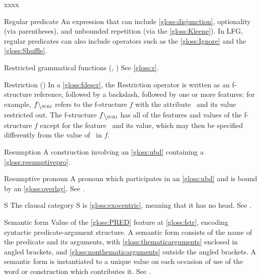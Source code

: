 \documentclass[output=paper,colorlinks,citecolor=brown]{langscibook}
\begin{document}
\begin{labeling}{xxxx}
\item[Regular predicate\namedlabel{gloss:regpreds}{regular predicates}] An expression that can include \ref{gloss:disjunction}, optionality (via parentheses), and unbounded repetition (via the \ref{gloss:Kleene}).  In LFG, regular predicates can also include operators such as the \ref{gloss:Ignore} and the \ref{gloss:Shuffle}.

\item[Restricted grammatical functions (\OBJTHETA, \OBLTHETA)] See \ref{gloss:r}.

\item[Restriction (\restrict{})\namedlabel{gloss:Restrict}{Restriction}] In a \ref{gloss:fdescr}, the Restriction operator is written as an f-structure reference, followed by a backslash, followed by one or more features: for example, $f\restrict{\SUBJ}$ refers to the f-structure $f$ with the attribute \SUBJ\ and its value restricted out.  The f-structure $f\restrict{\SUBJ}$ has all of the features and values of the f-structure $f$ except for the feature \SUBJ\ and its value, which may then be specified differently from the value of \SUBJ\ in $f$.

\item[Resumption\namedlabel{gloss:Resumption}{Resumption}] A construction involving an \ref{gloss:ubd} containing a \ref{gloss:resumptivepro}.

\item[Resumptive pronoun\namedlabel{gloss:resumptivepro}{resumptive pronoun}] A pronoun which participates in an \ref{gloss:ubd} and is bound by an \ref{gloss:overlay}.  See .

\item[S\namedlabel{gloss:S}{S}] The clausal category S is \ref{gloss:exocentric}, meaning that it has no head.  See \citetv[\ref{sec:CoreConcepts:S}]{chapters/CoreConcepts}.

\item[Semantic form\namedlabel{gloss:semanticform}{semantic form}\namedlabel{gloss:semanticforms}{semantic forms}] Value of the \ref{gloss:PRED} feature at \ref{gloss:fstr}, encoding syntactic predicate-argument structure.  A semantic form consists of the name of the predicate and its arguments, with \ref{gloss:thematicarguments} enclosed in angled brackets, and \ref{gloss:nonthematicarguments} outside the angled brackets. A semantic form is instantiated to a unique value on each occasion of use of the word or construction which contributes it.  See \citetv[\ref{sect:pred}]{chapters/CoreConcepts}.


\end{labeling}
\end{document}
